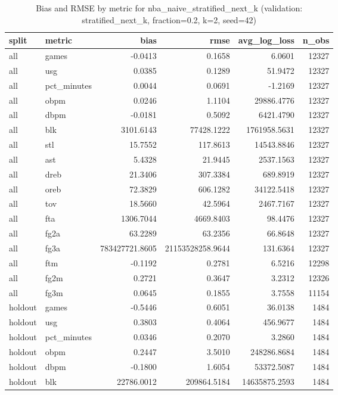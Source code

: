 \begin{table}
\caption{Bias and RMSE by metric for nba_naive_stratified_next_k (validation: stratified_next_k, fraction=0.2, k=2, seed=42)}
\label{tab:nba_naive_stratified_next_k_vs_stratified_next_k_f20_k2_s42_bias_rmse}
\begin{tabular}{llrrrr}
\toprule
split & metric & bias & rmse & avg\_log\_loss & n\_obs \\
\midrule
all & games & -0.0413 & 0.1658 & 6.0601 & 12327 \\
all & usg & 0.0385 & 0.1289 & 51.9472 & 12327 \\
all & pct\_minutes & 0.0044 & 0.0691 & -1.2169 & 12327 \\
all & obpm & 0.0246 & 1.1104 & 29886.4776 & 12327 \\
all & dbpm & -0.0181 & 0.5092 & 6421.4790 & 12327 \\
all & blk & 3101.6143 & 77428.1222 & 1761958.5631 & 12327 \\
all & stl & 15.7552 & 117.8613 & 14543.8846 & 12327 \\
all & ast & 5.4328 & 21.9445 & 2537.1563 & 12327 \\
all & dreb & 21.3406 & 307.3384 & 689.8919 & 12327 \\
all & oreb & 72.3829 & 606.1282 & 34122.5418 & 12327 \\
all & tov & 18.5660 & 42.5964 & 2467.7167 & 12327 \\
all & fta & 1306.7044 & 4669.8403 & 98.4476 & 12327 \\
all & fg2a & 63.2289 & 63.2356 & 66.8648 & 12327 \\
all & fg3a & 783427721.8605 & 21153528258.9644 & 131.6364 & 12327 \\
all & ftm & -0.1192 & 0.2781 & 6.5216 & 12298 \\
all & fg2m & 0.2721 & 0.3647 & 3.2312 & 12326 \\
all & fg3m & 0.0645 & 0.1855 & 3.7558 & 11154 \\
holdout & games & -0.5446 & 0.6051 & 36.0138 & 1484 \\
holdout & usg & 0.3803 & 0.4064 & 456.9677 & 1484 \\
holdout & pct\_minutes & 0.0346 & 0.2070 & 3.2860 & 1484 \\
holdout & obpm & 0.2447 & 3.5010 & 248286.8684 & 1484 \\
holdout & dbpm & -0.1800 & 1.6054 & 53372.5087 & 1484 \\
holdout & blk & 22786.0012 & 209864.5184 & 14635875.2593 & 1484 \\

\end{tabular}
\end{table}
